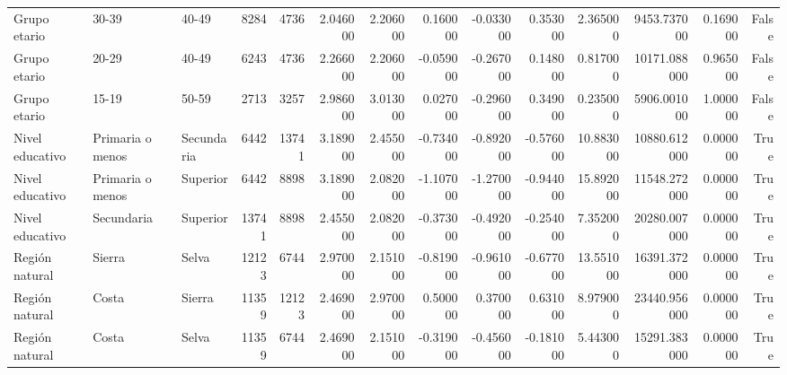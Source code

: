 \begin{table}[htbp]
\begin{tabular}{lllrrrrrrrrrrr}
Grupo etario & 30-39 & 40-49 & 8284 & 4736 & 2.046000 & 2.206000 & 0.160000 & -0.033000 & 0.353000 & 2.365000 & 9453.737000 & 0.169000 & False \\
Grupo etario & 20-29 & 40-49 & 6243 & 4736 & 2.266000 & 2.206000 & -0.059000 & -0.267000 & 0.148000 & 0.817000 & 10171.088000 & 0.965000 & False \\
Grupo etario & 15-19 & 50-59 & 2713 & 3257 & 2.986000 & 3.013000 & 0.027000 & -0.296000 & 0.349000 & 0.235000 & 5906.001000 & 1.000000 & False \\
Nivel educativo & Primaria o menos & Secundaria & 6442 & 13741 & 3.189000 & 2.455000 & -0.734000 & -0.892000 & -0.576000 & 10.883000 & 10880.612000 & 0.000000 & True \\
Nivel educativo & Primaria o menos & Superior & 6442 & 8898 & 3.189000 & 2.082000 & -1.107000 & -1.270000 & -0.944000 & 15.892000 & 11548.272000 & 0.000000 & True \\
Nivel educativo & Secundaria & Superior & 13741 & 8898 & 2.455000 & 2.082000 & -0.373000 & -0.492000 & -0.254000 & 7.352000 & 20280.007000 & 0.000000 & True \\
Región natural & Sierra & Selva & 12123 & 6744 & 2.970000 & 2.151000 & -0.819000 & -0.961000 & -0.677000 & 13.551000 & 16391.372000 & 0.000000 & True \\
Región natural & Costa & Sierra & 11359 & 12123 & 2.469000 & 2.970000 & 0.500000 & 0.370000 & 0.631000 & 8.979000 & 23440.956000 & 0.000000 & True \\
Región natural & Costa & Selva & 11359 & 6744 & 2.469000 & 2.151000 & -0.319000 & -0.456000 & -0.181000 & 5.443000 & 15291.383000 & 0.000000 & True \\
\bottomrule
\end{tabular}
\end{table}
